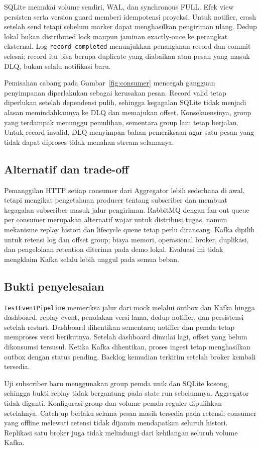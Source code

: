 SQLite memakai volume sendiri, WAL, dan synchronous FULL. Efek view persisten serta version guard memberi idempotensi proyeksi. Untuk notifier, crash setelah send tetapi sebelum marker dapat menghasilkan pengiriman ulang. Dedup lokal bukan distributed lock maupun jaminan exactly-once ke perangkat eksternal. Log \texttt{record\_completed} menunjukkan penanganan record dan commit selesai; record itu bisa berupa duplicate yang diabaikan atau pesan yang masuk DLQ, bukan selalu notifikasi baru.

Pemisahan cabang pada Gambar~\ref{fig:consumer} mencegah gangguan penyimpanan diperlakukan sebagai kerusakan pesan. Record valid tetap diperlukan setelah dependensi pulih, sehingga kegagalan SQLite tidak menjadi alasan memindahkannya ke DLQ dan memajukan offset. Konsekuensinya, group yang terdampak menunggu pemulihan, sementara group lain tetap berjalan. Untuk record invalid, DLQ menyimpan bahan pemeriksaan agar satu pesan yang tidak dapat diproses tidak menahan stream selamanya.

\subsection{Alternatif dan trade-off}
Pemanggilan HTTP setiap consumer dari Aggregator lebih sederhana di awal, tetapi mengikat pengetahuan producer tentang subscriber dan membuat kegagalan subscriber masuk jalur pengiriman. RabbitMQ dengan fan-out queue per consumer merupakan alternatif wajar untuk distribusi tugas, namun mekanisme replay histori dan lifecycle queue tetap perlu dirancang. Kafka dipilih untuk retensi log dan offset group; biaya memori, operasional broker, duplikasi, dan pengelolaan retention diterima pada demo lokal. Evaluasi ini tidak mengklaim Kafka selalu lebih unggul pada semua beban.

\subsection{Bukti penyelesaian}
\texttt{TestEventPipeline} memeriksa jalur dari mock melalui outbox dan Kafka hingga dashboard, replay event, penolakan versi lama, dedup notifier, dan persistensi setelah restart. Dashboard dihentikan sementara; notifier dan pemda tetap memproses versi berikutnya. Setelah dashboard dimulai lagi, offset yang belum dikonsumsi tersusul. Ketika Kafka dihentikan, proses ingest tetap menghasilkan outbox dengan status pending. Backlog kemudian terkirim setelah broker kembali tersedia.

Uji subscriber baru menggunakan group pemda unik dan SQLite kosong, sehingga bukti replay tidak bergantung pada state run sebelumnya. Aggregator tidak diganti. Konfigurasi group dan volume pemda reguler dipulihkan setelahnya. Catch-up berlaku selama pesan masih tersedia pada retensi; consumer yang offline melewati retensi tidak dijamin mendapatkan seluruh histori. Replikasi satu broker juga tidak melindungi dari kehilangan seluruh volume Kafka.
